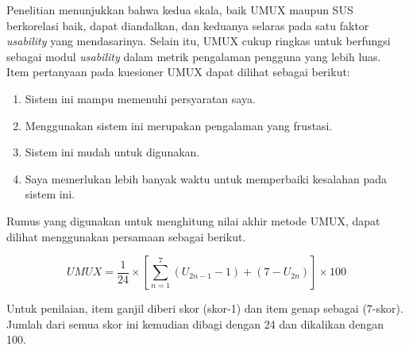 \par Penelitian \citep{finstad2010usability} menunjukkan bahwa kedua skala, baik UMUX maupun SUS berkorelasi baik, dapat diandalkan, dan keduanya selaras pada satu faktor \textit{usability} yang mendasarinya. Selain itu, UMUX cukup ringkas untuk berfungsi sebagai modul \textit{usability} dalam metrik pengalaman pengguna yang lebih luas. Item pertanyaan pada kuesioner UMUX dapat dilihat sebagai berikut:

\begin{enumerate}
	\item Sistem ini mampu memenuhi persyaratan saya.
	\item Menggunakan sistem ini merupakan pengalaman yang frustasi.
	\item Sistem ini mudah untuk digunakan.
	\item Saya memerlukan lebih banyak waktu untuk memperbaiki kesalahan pada sistem ini.
\end{enumerate}

Rumus yang digunakan untuk menghitung nilai akhir metode UMUX, dapat dilihat menggunakan persamaan sebagai berikut.

\begin{equation}
	UMUX = \frac{1}{24} \times \left [ \sum_{n=1}^{7}\left ( U_{2n-1}-1 \right ) + \left ( 7-U_{2n} \right )\right ]\times 100
\end{equation}

Untuk penilaian, item ganjil diberi skor (skor-1) dan item genap sebagai (7-skor). Jumlah dari semua skor ini kemudian dibagi dengan 24 dan dikalikan dengan 100.



\fancyhf{} 
\fancyfoot[R]{\thepage}

